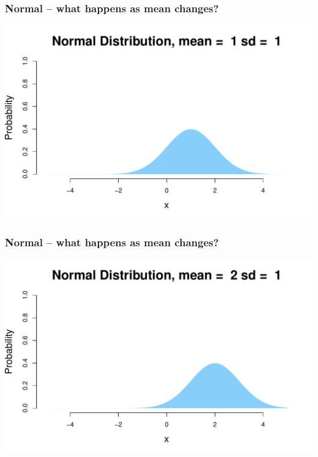 \documentclass[aspectratio=169]{beamer}
\theoremstyle{principle}
\begin{document}
\begin{frame}
\frametitle{Normal -- what happens as mean changes?}

\begin{center}
\includegraphics[scale=0.5]{Normal_1_1.pdf}
\end{center}

\end{frame}

\begin{frame}
\frametitle{Normal -- what happens as mean changes?}

\begin{center}
\includegraphics[scale=0.5]{Normal_2_1.pdf}
\end{center}

\end{frame}
\end{document}
